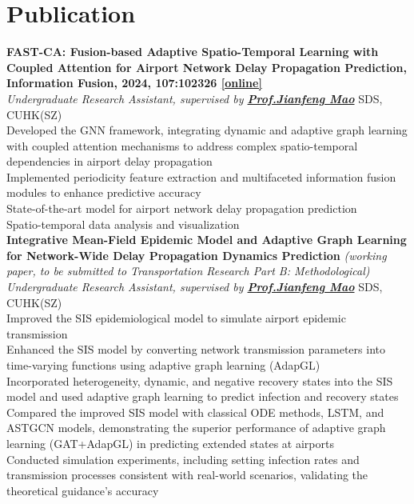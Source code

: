 \documentclass[a4paper,8pt]{article}
\begin{document}
\section*{Publication}
\textbf{FAST-CA: Fusion-based Adaptive Spatio-Temporal Learning with Coupled Attention for Airport Network Delay Propagation Prediction, Information Fusion, 2024, 107:102326 \href{https://www.sciencedirect.com/science/article/pii/S1566253524001040}{[online]}} \\
\textit{Undergraduate Research Assistant, supervised by \textbf{\href{https://sds.cuhk.edu.cn/en/teacher/268}{Prof.\@ Jianfeng Mao}}} \hfill SDS, CUHK(SZ)\\
\textbullet Developed the GNN framework, integrating dynamic and adaptive graph learning with coupled attention mechanisms to address complex spatio-temporal dependencies in airport delay propagation\\
\textbullet Implemented periodicity feature extraction and multifaceted information fusion modules to enhance predictive accuracy\\
\textbullet State-of-the-art model for airport network delay propagation prediction\\
\textbullet Spatio-temporal data analysis and visualization\\
\textbf{Integrative Mean-Field Epidemic Model and Adaptive Graph Learning for Network-Wide Delay Propagation Dynamics Prediction} \textit{\small (working paper, to be submitted to Transportation Research Part B: Methodological)} \\
\textit{Undergraduate Research Assistant, supervised by \textbf{\href{https://sds.cuhk.edu.cn/en/teacher/268}{Prof.\@ Jianfeng Mao}}} \hfill SDS, CUHK(SZ)\\
\textbullet Improved the SIS epidemiological model to simulate airport epidemic transmission\\
\textbullet Enhanced the SIS model by converting network transmission parameters into time-varying functions using adaptive graph learning (AdapGL)\\
\textbullet Incorporated heterogeneity, dynamic, and negative recovery states into the SIS model and used adaptive graph learning to predict infection and recovery states\\
\textbullet Compared the improved SIS model with classical ODE methods, LSTM, and ASTGCN models, demonstrating the superior performance of adaptive graph learning (GAT+AdapGL) in predicting extended states at airports\\
\textbullet Conducted simulation experiments, including setting infection rates and transmission processes consistent with real-world scenarios, validating the theoretical guidance's accuracy\\
\end{document}
